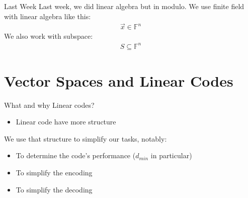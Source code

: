 \begin{parag}{Last Week}
    Last week, we did linear algebra but in modulo. We use finite field with linear algebra like this:
    \begin{align*} \vec{x} \in \mathbb{F}^n \end{align*}
    We also work with subspace:
    \begin{align*} S \subseteq \mathbb{F}^n \end{align*}
\end{parag}


\section{Vector Spaces and Linear Codes}

\begin{parag}{What and why Linear codes?}
    \begin{itemize}
        \item Linear code have more structure
    \end{itemize}
    We use that structure to simplify our tasks,  notably:
    \begin{itemize}
        \item To determine the code's performance ($d_{min}$ in particular)
        \item To simplify the encoding
        \item To simplify the decoding
    \end{itemize}
    
\end{parag}
